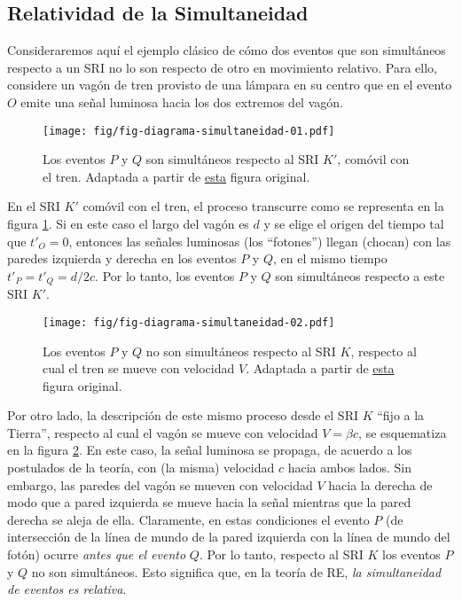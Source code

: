 \subsection{Relatividad de la Simultaneidad}
Consideraremos aquí el ejemplo clásico de cómo dos eventos que son simultáneos respecto a un SRI no lo son respecto de otro en movimiento relativo. Para ello, considere un vagón de tren provisto de una lámpara en su centro que en el evento $O$ emite una señal luminosa hacia los dos extremos del vagón.
\begin{figure}[H]
\centerline{\texttt{[image: fig/fig-diagrama-simultaneidad-01.pdf]}}
\caption{Los eventos $P$ y $Q$ son simultáneos respecto al SRI $K'$, comóvil con el tren. Adaptada a partir de \href{https://commons.wikimedia.org/wiki/File:Traincar_Relativity1.svg}{esta} figura original.}
\label{sim01}
\end{figure}
En el SRI $K'$ comóvil con el tren, el proceso transcurre como se representa en la figura \ref{sim01}. Si en este caso el largo del vagón es $d$ y se elige el origen del tiempo tal que $t'_O=0$, entonces las señales luminosas (los ``fotones'') llegan (chocan) con las paredes izquierda y derecha en los eventos $P$ y $Q$, en el mismo tiempo $t'_P=t'_Q=d/2c$. Por lo tanto, los eventos $P$ y $Q$ son simultáneos respecto a este SRI $K'$.
\begin{figure}[H]
\centerline{\texttt{[image: fig/fig-diagrama-simultaneidad-02.pdf]}}
\caption{Los eventos $P$ y $Q$ no son simultáneos respecto al SRI $K$, respecto al cual el tren se mueve con velocidad $V$. Adaptada a partir de \href{https://commons.wikimedia.org/wiki/File:Traincar_Relativity2.svg}{esta} figura original.}
\label{sim02}
\end{figure}

Por otro lado, la descripción de este mismo proceso desde el SRI $K$ ``fijo a la Tierra'', respecto al cual el vagón se mueve con velocidad $V=\beta c$, se esquematiza en la figura \ref{sim02}. En este caso, la señal luminosa se propaga, de acuerdo a los postulados de la teoría, con (la misma) velocidad $c$ hacia ambos lados. Sin embargo, las paredes del vagón se mueven con velocidad $V$ hacia la derecha de modo que a pared izquierda se mueve hacia la señal mientras que la pared derecha se aleja de ella. Claramente, en estas condiciones el evento $P$ (de intersección de la línea de mundo de la pared izquierda con la línea de mundo del fotón) ocurre \textit{antes que el evento} $Q$. Por lo tanto, respecto al SRI $K$ los eventos $P$ y $Q$ no son simultáneos. Esto significa que, en la teoría de RE, \textit{la simultaneidad de eventos es relativa}.

